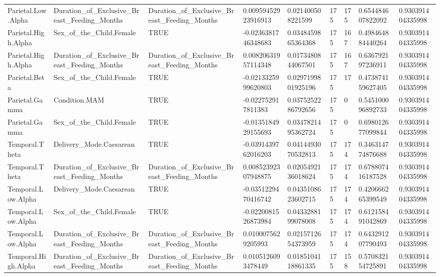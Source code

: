 \begin{longtable}{lllllllll}
Parietal.Low.Alpha & Duration\_of\_Exclusive\_Breast\_Feeding\_Months & Duration\_of\_Exclusive\_Breast\_Feeding\_Months & 0.00959452923916913 & 0.021400508221599 & 175 & 175 & 0.654484607822092 & 0.930391404335998 \\
Parietal.High.Alpha & Sex\_of\_the\_Child.Female & TRUE & -0.0236381746348683 & 0.0348459865364368 & 175 & 167 & 0.498464884440264 & 0.930391404335998 \\
Parietal.High.Alpha & Duration\_of\_Exclusive\_Breast\_Feeding\_Months & Duration\_of\_Exclusive\_Breast\_Feeding\_Months & 0.00820631957114348 & 0.0173480844067501 & 175 & 167 & 0.636792197236911 & 0.930391404335998 \\
Parietal.Beta & Sex\_of\_the\_Child.Female & TRUE & -0.0213325999620803 & 0.0297199801925196 & 175 & 17 & 0.473874159627405 & 0.930391404335998 \\
Parietal.Gamma & Condition.MAM & TRUE & -0.022752917811383 & 0.0375252286792656 & 175 & 0 & 0.545100096892733 & 0.930391404335998 \\
Parietal.Gamma & Sex\_of\_the\_Child.Female & TRUE & -0.0135184929155693 & 0.0347821495362724 & 175 & 0 & 0.698012677099844 & 0.930391404335998 \\
Temporal.Theta & Delivery\_Mode.Caesarean & TRUE & -0.0391439762016203 & 0.0414493070532813 & 175 & 174 & 0.346314774876688 & 0.930391404335998 \\
Temporal.Theta & Duration\_of\_Exclusive\_Breast\_Feeding\_Months & Duration\_of\_Exclusive\_Breast\_Feeding\_Months & 0.00852392307948875 & 0.0205492136018624 & 175 & 174 & 0.678807416187528 & 0.930391404335998 \\
Temporal.Low.Alpha & Delivery\_Mode.Caesarean & TRUE & -0.0351229470416742 & 0.0435108623602715 & 175 & 174 & 0.420666265399549 & 0.930391404335998 \\
Temporal.Low.Alpha & Sex\_of\_the\_Child.Female & TRUE & -0.0220081526873984 & 0.0433288199078008 & 175 & 174 & 0.612158491042869 & 0.930391404335998 \\
Temporal.Low.Alpha & Duration\_of\_Exclusive\_Breast\_Feeding\_Months & Duration\_of\_Exclusive\_Breast\_Feeding\_Months & 0.0100075629205993 & 0.0215712654373959 & 175 & 174 & 0.643291207790493 & 0.930391404335998 \\
Temporal.High.Alpha & Duration\_of\_Exclusive\_Breast\_Feeding\_Months & Duration\_of\_Exclusive\_Breast\_Feeding\_Months & 0.0105126093478449 & 0.0185104118861335 & 175 & 158 & 0.570832154725891 & 0.930391404335998 \\

\end{longtable}

